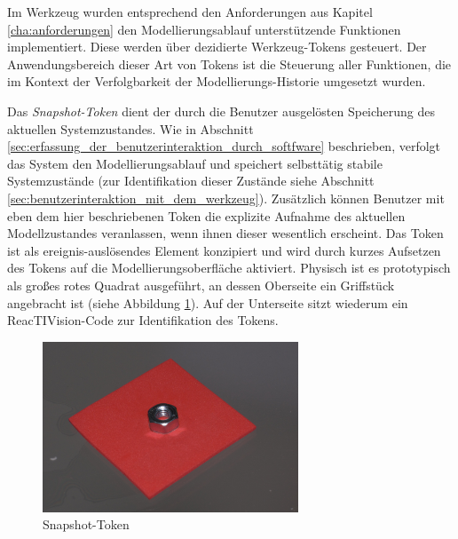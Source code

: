 Im Werkzeug wurden entsprechend den Anforderungen aus Kapitel \ref{cha:anforderungen} den Modellierungsablauf unterstützende Funktionen implementiert. Diese werden über dezidierte Werkzeug-Tokens gesteuert. Der Anwendungsbereich dieser Art von Tokens ist die Steuerung aller Funktionen, die im Kontext der Verfolgbarkeit der Modellierungs-Historie umgesetzt wurden. 

Das \emph{Snapshot-Token} dient der durch die Benutzer ausgelösten Speicherung des aktuellen Systemzustandes. Wie in Abschnitt \ref{sec:erfassung_der_benutzerinteraktion_durch_softfware} beschrieben, verfolgt das System den Modellierungsablauf und speichert selbsttätig stabile Systemzustände (zur Identifikation dieser Zustände siehe Abschnitt \ref{sec:benutzerinteraktion_mit_dem_werkzeug}). Zusätzlich können Benutzer mit eben dem hier beschriebenen Token die explizite Aufnahme des aktuellen Modellzustandes veranlassen, wenn ihnen dieser wesentlich erscheint. Das Token ist als ereignis-auslösendes Element konzipiert und wird durch kurzes Aufsetzen des Tokens auf die Modellierungsoberfläche aktiviert. Physisch ist es prototypisch als großes rotes Quadrat ausgeführt, an dessen Oberseite ein Griffstück angebracht ist (siehe Abbildung \ref{fig:img_SystemNeu_Snapshottoken}). Auf der Unterseite sitzt wiederum ein ReacTIVision-Code zur Identifikation des Tokens.

\begin{figure}[htbp]
	\centering
		\includegraphics[height=2in]{img/SystemNeu/Snapshottoken.jpg}
	\caption{Snapshot-Token}
	\label{fig:img_SystemNeu_Snapshottoken}
\end{figure}

